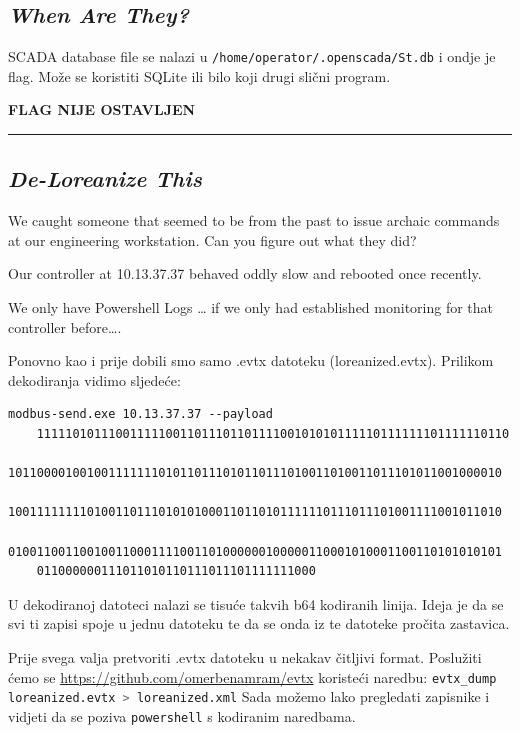 \documentclass{article}
\begin{document}
\subsection{\textit{When Are They?}}
SCADA database file se nalazi u \lstinline{/home/operator/.openscada/St.db} i ondje je flag. 
Može se koristiti SQLite ili bilo koji drugi slični program.
\newline
\newline
\begin{center}
    \textbf{FLAG NIJE OSTAVLJEN}    
\end{center}
\noindent\rule{\textwidth}{0.4pt}

\subsection{\textit{De-Loreanize This}}
\begin{tcolorbox}[
    colback=gray!5,  %
    colframe=gray!75,  %
    title=\textbf{Zadatak}]
    We caught someone that seemed to be from the past to issue archaic commands at our engineering workstation. Can you figure out what they did?

    Our controller at 10.13.37.37 behaved oddly slow and rebooted once recently.
    
    We only have Powershell Logs … if we only had established monitoring for that controller before….
\end{tcolorbox}

Ponovno kao i prije dobili smo samo .evtx datoteku (loreanized.evtx). Prilikom dekodiranja vidimo sljedeće:
\newline
\begin{lstlisting}[breaklines=true, basicstyle=\ttfamily]
    modbus-send.exe 10.13.37.37 --payload 
    111110101110011111001101110110111100101010111110111111101111110110
    101100001001001111111010110111010110111010011010011011101011001000010
    100111111110100110111010101000110110101111110111011101001111001011010
    010011001100100110001111001101000000100000110001010001100110101010101
    011000000111011010110111011101111111000
\end{lstlisting}

U dekodiranoj datoteci nalazi se tisuće takvih b64 kodiranih linija. Ideja je da se svi ti zapisi spoje u jednu datoteku 
te da se onda iz te datoteke pročita zastavica.

Prije svega valja pretvoriti .evtx datoteku u nekakav čitljivi format. 
Poslužiti ćemo se \url{https://github.com/omerbenamram/evtx} koristeći naredbu:
\lstinline[language=bash]{evtx_dump loreanized.evtx > loreanized.xml}
Sada možemo lako pregledati zapisnike i vidjeti da se poziva \texttt{powershell} s kodiranim naredbama.
\end{document}
